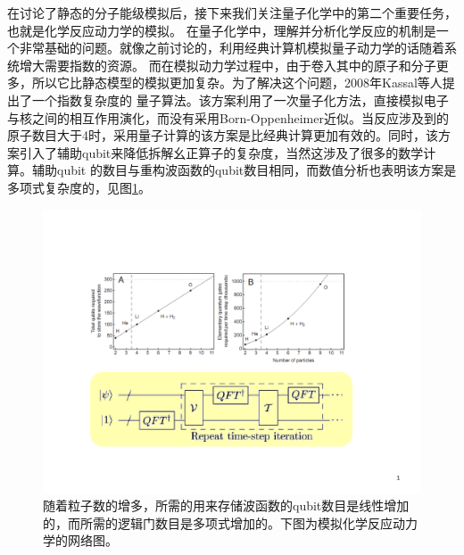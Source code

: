  在讨论了静态的分子能级模拟后，接下来我们关注量子化学中的第二个重要任务，也就是化学反应动力学的模拟。
在量子化学中，理解并分析化学反应的机制是一个非常基础的问题。就像之前讨论的，利用经典计算机模拟量子动力学的话随着系统增大需要指数的资源\cite{hydro6}。
而在模拟动力学过程中，由于卷入其中的原子和分子更多，所以它比静态模型的模拟更加复杂。为了解决这个问题，2008年Kassal等人提出了一个指数复杂度的
量子算法\cite{Polynomial_time_algorithm}。该方案利用了一次量子化方法，直接模拟电子与核之间的相互作用演化，而没有采用Born-Oppenheimer近似。当反应涉及到的
原子数目大于4时，采用量子计算的该方案是比经典计算更加有效的。同时，该方案引入了辅助qubit来降低拆解幺正算子的复杂度，当然这涉及了很多的数学计算。辅助qubit
的数目与重构波函数的qubit数目相同，而数值分析也表明该方案是多项式复杂度的，见图\ref{dynamicalcomplex}。

\begin{figure}[htbp]
            \begin{center}
              \includegraphics[width= 0.8\columnwidth]{figures/dynamicalcomplex.pdf}
              \caption{随着粒子数的增多，所需的用来存储波函数的qubit数目是线性增加的，而所需的逻辑门数目是多项式增加的。下图为模拟化学反应动力学的网络图。}\label{dynamicalcomplex}
            \end{center}
 \end{figure}

